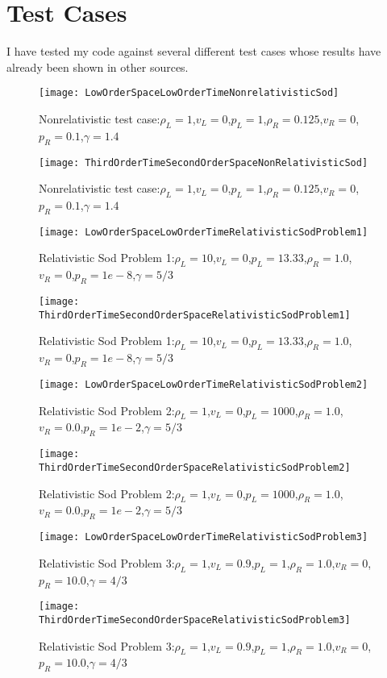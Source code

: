 \pagebreak
\section{Test Cases}
I have tested my code against several different test cases whose results have already been shown in other sources. 
\begin{figure}[h]
        \centering
        \texttt{[image: LowOrderSpaceLowOrderTimeNonrelativisticSod]}
        \caption{Nonrelativistic test case:$\rho_L=1$,$v_L=0$,$p_L=1$,$\rho_R=0.125$,$v_R=0$,$p_R=0.1$,$\gamma=1.4$ }
\end{figure}

\begin{figure}[h]
        \centering
        \texttt{[image: ThirdOrderTimeSecondOrderSpaceNonRelativisticSod]}
        \caption{Nonrelativistic test case:$\rho_L=1$,$v_L=0$,$p_L=1$,$\rho_R=0.125$,$v_R=0$,$p_R=0.1$,$\gamma=1.4$ }
\end{figure}

\begin{figure}[h]
        \centering
        \texttt{[image: LowOrderSpaceLowOrderTimeRelativisticSodProblem1]}
        \caption{Relativistic Sod Problem 1:$\rho_L=10$,$v_L=0$,$p_L=13.33$,$\rho_R=1.0$,$v_R=0$,$p_R=1e-8$,$\gamma=5/3$ }
\end{figure}

\begin{figure}[h]
        \centering
        \texttt{[image: ThirdOrderTimeSecondOrderSpaceRelativisticSodProblem1]}
        \caption{Relativistic Sod Problem 1:$\rho_L=10$,$v_L=0$,$p_L=13.33$,$\rho_R=1.0$,$v_R=0$,$p_R=1e-8$,$\gamma=5/3$ }
\end{figure}

\begin{figure}[h]
        \centering
        \texttt{[image: LowOrderSpaceLowOrderTimeRelativisticSodProblem2]}
        \caption{Relativistic Sod Problem 2:$\rho_L=1$,$v_L=0$,$p_L=1000$,$\rho_R=1.0$,$v_R=0.0$,$p_R=1e-2$,$\gamma=5/3$ }
\end{figure}

\begin{figure}[h]
        \centering
        \texttt{[image: ThirdOrderTimeSecondOrderSpaceRelativisticSodProblem2]}
        \caption{Relativistic Sod Problem 2:$\rho_L=1$,$v_L=0$,$p_L=1000$,$\rho_R=1.0$,$v_R=0.0$,$p_R=1e-2$,$\gamma=5/3$ }
\end{figure}

\begin{figure}[h]
        \centering
        \texttt{[image: LowOrderSpaceLowOrderTimeRelativisticSodProblem3]}
        \caption{Relativistic Sod Problem 3:$\rho_L=1$,$v_L=0.9$,$p_L=1$,$\rho_R=1.0$,$v_R=0$,$p_R=10.0$,$\gamma=4/3$ }
\end{figure}

\begin{figure}[h]
        \centering
        \texttt{[image: ThirdOrderTimeSecondOrderSpaceRelativisticSodProblem3]}
        \caption{Relativistic Sod Problem 3:$\rho_L=1$,$v_L=0.9$,$p_L=1$,$\rho_R=1.0$,$v_R=0$,$p_R=10.0$,$\gamma=4/3$ }
\end{figure}
